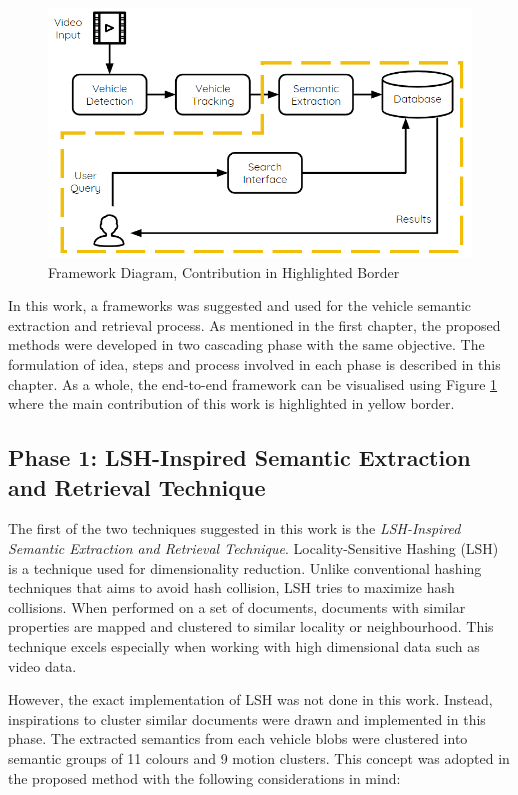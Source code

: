 \begin{figure}[hbt!]\centering
\includegraphics[width=.9\textwidth]{image/new/framework_new.PNG}
\caption{Framework Diagram, Contribution in Highlighted Border}
\label{fig:framework}
\end{figure}


In this work, a frameworks was suggested and used for the vehicle semantic extraction and retrieval process.
As mentioned in the first chapter, the proposed methods were developed in two cascading phase with the same objective.
The formulation of idea, steps and process involved in each phase is described in this chapter.
As a whole, the end-to-end framework can be visualised using Figure \ref{fig:framework} where the main contribution of this work is highlighted in yellow border.

\subsection{Phase 1: LSH-Inspired Semantic Extraction and Retrieval Technique}
The first of the two techniques suggested in this work is the \textit{LSH-Inspired Semantic Extraction and Retrieval Technique}. Locality-Sensitive Hashing (LSH) is a technique used for dimensionality reduction.
Unlike conventional hashing techniques that aims to avoid hash collision, LSH tries to maximize hash collisions.
When performed on a set of documents, documents with similar properties are mapped and clustered to similar locality or neighbourhood. This technique excels especially when working with high dimensional data such as video data.

However, the exact implementation of LSH was not done in this work. Instead, inspirations to cluster similar documents were drawn and implemented in this phase. The extracted semantics from each vehicle blobs were clustered into semantic groups of 11 colours and 9 motion clusters. This concept was adopted in the proposed method with the following considerations in mind:

